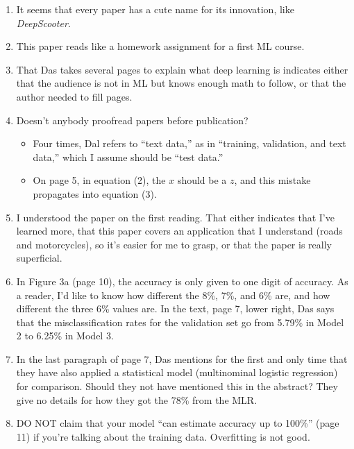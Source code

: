 \documentclass[11pt]{article}
\begin{document}
\begin{spacing}{1.2}
\begin{enumerate}
	\item It seems that every paper has a cute name for its innovation, like {\it DeepScooter}.
	\item This paper reads like a homework assignment for a first ML course.
	\item That Das takes several pages to explain what deep learning is indicates either that the audience is not in ML but knows enough math to follow, or that the author needed to fill pages.  
	\item Doesn't anybody proofread papers before publication?  
	\begin{itemize}
		\item Four times, Dal refers to ``text data,'' as in ``training, validation, and text data,'' which I assume should be ``test data.''
		\item On page 5, in equation (2), the $x$ should be a $z$, and this mistake propagates into equation (3).
	\end{itemize}
	\item I understood the paper on the first reading.  That either indicates that I've learned more, that this paper covers an application that I understand (roads and motorcycles), so it's easier for me to grasp, or that the paper is really superficial.  
	\item In Figure 3a (page 10), the accuracy is only given to one digit of accuracy.  As a reader, I'd like to know how different the 8\%, 7\%, and 6\% are, and how different the three 6\% values are.  In the text, page 7, lower right, Das says that the misclassification rates for the validation set go from 5.79\% in Model 2 to 6.25\% in Model 3.
	\item In the last paragraph of page 7, Das mentions for the first and only time that they have also applied a statistical model (multinominal logistic regression) for comparison.  Should they not have mentioned this in the abstract?  They give no details for how they got the 78\% from the MLR.  
	\item DO NOT claim that your model ``can estimate accuracy up to 100\%'' (page 11) if you're talking about the training data.  Overfitting is not good.
\end{enumerate}
		

\end{spacing}
\end{document}
